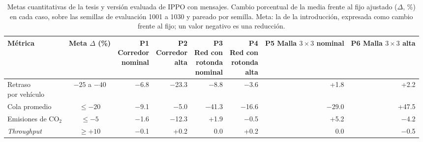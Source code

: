 \begin{table}[H]
\centering
\footnotesize
\setlength{\tabcolsep}{3pt}
\begin{tabular}{lcrrrrrr}
\toprule
Métrica & \makecell{Meta\\$\Delta$ (\%)} & \makecell{P1\\Corredor\\nominal} & \makecell{P2\\Corredor\\alta} & \makecell{P3\\Red con\\rotonda\\nominal} & \makecell{P4\\Red con\\rotonda\\alta} & \makecell{P5\\Malla $3 \times 3$\\nominal} & \makecell{P6\\Malla $3 \times 3$\\alta} \\
\midrule
\makecell[l]{Retraso\\por vehículo} & $-25$ a $-40$ & $-$6.8 & $-$23.3 & $-$8.8 & $-$3.6 & +1.8 & +2.2 \\
Cola promedio & $\leq -20$ & $-$9.1 & $-$5.0 & $-$41.3 & $-$16.6 & $-$29.0 & +47.5 \\
Emisiones de CO$_2$ & $\leq -5$ & $-$1.6 & $-$12.3 & +1.9 & $-$0.5 & +5.2 & $-$4.2 \\
\textit{Throughput} & $\geq +10$ & $-$0.1 & +0.2 & 0.0 & +0.2 & 0.0 & $-$0.5 \\
\bottomrule
\end{tabular}
\caption[Metas cuantitativas frente al fijo ajustado]{Metas cuantitativas de la tesis y versión evaluada de IPPO con mensajes. Cambio porcentual de la media frente al fijo ajustado ($\Delta$, \%) en cada caso, sobre las semillas de evaluación 1001 a 1030 y pareado por semilla. Meta: la de la introducción, expresada como cambio frente al fijo; un valor negativo es una reducción.}
\label{tab:plan2-metas}
\end{table}
